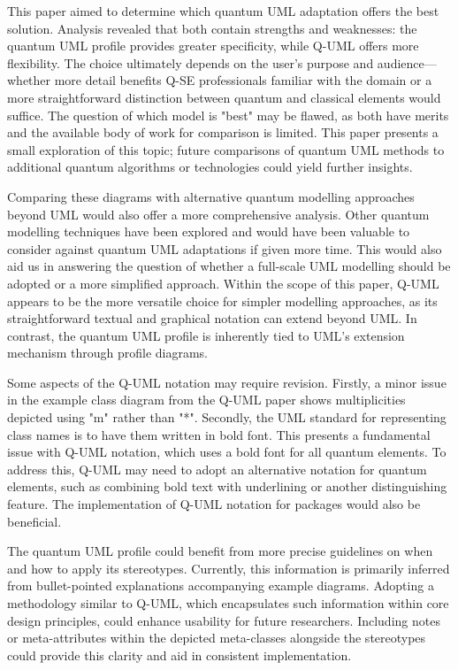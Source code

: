 \documentclass{article}
\begin{document}
This paper aimed to determine which quantum UML adaptation offers the best solution. Analysis revealed that both contain strengths and weaknesses: the quantum UML profile provides greater specificity, while Q-UML offers more flexibility. The choice ultimately depends on the user's purpose and audience—whether more detail benefits Q-SE professionals familiar with the domain or a more straightforward distinction between quantum and classical elements would suffice. The question of which model is "best" may be flawed, as both have merits and the available body of work for comparison is limited. This paper presents a small exploration of this topic; future comparisons of quantum UML methods to additional quantum algorithms or technologies could yield further insights. 

Comparing these diagrams with alternative quantum modelling approaches beyond UML would also offer a more comprehensive analysis. Other quantum modelling techniques have been explored and would have been valuable to consider against quantum UML adaptations if given more time\cite{9233151}\cite{app132111794}. This would also aid us in answering the question of whether a full-scale UML modelling should be adopted or a more simplified approach. Within the scope of this paper, Q-UML appears to be the more versatile choice for simpler modelling approaches, as its straightforward textual and graphical notation can extend beyond UML. In contrast, the quantum UML profile is inherently tied to UML's extension mechanism through profile diagrams. 

Some aspects of the Q-UML notation may require revision. Firstly, a minor issue in the example class diagram from the Q-UML paper shows multiplicities depicted using "m" rather than "*". Secondly, the UML standard for representing class names is to have them written in bold font\cite{Seidl_Scholz_Huemer_Kappel_Duffy_2014}. This presents a fundamental issue with Q-UML notation, which uses a bold font for all quantum elements. To address this, Q-UML may need to adopt an alternative notation for quantum elements, such as combining bold text with underlining or another distinguishing feature. The implementation of Q-UML notation for packages would also be beneficial. 

The quantum UML profile could benefit from more precise guidelines on when and how to apply its stereotypes. Currently, this information is primarily inferred from bullet-pointed explanations accompanying example diagrams. Adopting a methodology similar to Q-UML, which encapsulates such information within core design principles, could enhance usability for future researchers. Including notes or meta-attributes within the depicted meta-classes alongside the stereotypes could provide this clarity and aid in consistent implementation.
\end{document}
